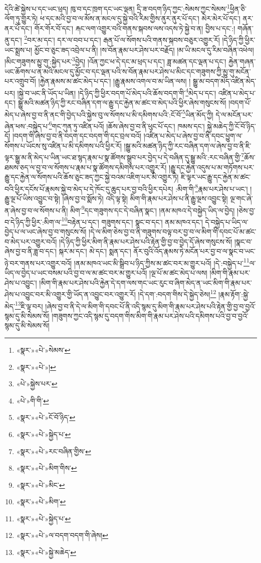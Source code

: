 དེའི་ཚེ་སྐྱེས་པ་དང་ཡང་ཕྲད། ཁུ་བ་དང་ཁྲག་དང་ཡང་ལྡན། དྲི་ཟ་བདག་ཉིད་ཀྱང་:སེམས་ཀྱང་སེམས་\footnote{«སྣར་»«པེ་»སེམས་}ཕྱིན་ཅི་ལོག་ཏུ་གྱུར་ཏེ། ཕ་དང་མའི་བྱ་བ་ལ་མོས་ན་མངལ་དུ་སྐྱེ་བའི་རིམ་གྱིས་ནུར་ནུར་པོ་དང་། མེར་མེར་པོ་དང་། ནར་ནར་པོ་དང་། གོར་གོར་བོ་དང་། རྐང་ལག་འགྱུར་བའི་གནས་སྐབས་ལས་འདས་ཏེ་སྐྱེ་བ་ན། བྱིས་པ་དང་:། གཞོན་ནུ་དང་། \footnote{«སྣར་»«པེ་»།  }བར་མ་དང་། དར་ལ་བབ་པ་དང་། རྒན་པོ་ལ་སོགས་པའི་གནས་སྐབས་བཅུར་འགྱུར་རོ། །དེ་ཉིད་ཀྱི་ཕྱིར་ཡང་སྨྲས་པ། མྱོང་བ་ཅུང་ཟད་འབྲེལ་པ་ནི། །ས་བོན་རྣམ་པར་ཤེས་པར་བརྗོད། །མ་ཡི་མངལ་དུ་རིམ་བཞིན་འཕེལ། །མིང་གཟུགས་མྱུ་གུ་:སྐྱེད་པར་\footnote{«པེ་»སྐྱེས་པར་}བྱེད། །འོན་ཀྱང་ཕ་དེ་དང་མ་ཕྲད་པ་དང་། ཟླ་མཚན་དང་ལྡན་པ་དང་། རྐྱེན་གཞན་ཡང་ཆོགས་པ་ན་མའི་མངལ་དུ་མྱོང་བ་དང་ལྡན་པའི་ས་བོན་རྣམ་པར་ཤེས་པ་མིང་དང་གཟུགས་ཀྱི་མྱུ་གུ་མངོན་པར་འགྲུབ་བོ། །རྐྱེན་རྣམས་མ་ཚང་མེད་པ་དང་། །རྒྱུ་རྣམས་འགལ་བ་མ་ཡིན་ལས། །
སྒྱུ་མ་བདག་མེད་འཛིན་མེད་པར། །སྐྱེ་བ་ཡང་ནི་ཡོད་པ་ཡིན། །དེ་ཉིད་ཀྱི་ཕྱིར་བདག་པོ་མེད་པའི་ཆོས་བདག་གི་\footnote{«པེ་»གི་གི་}མེད་པ་དང་། འཛིན་པ་མེད་པ་དང་། སྒྱུ་མའི་མཚན་ཉིད་ཀྱི་རང་བཞིན་དག་ལ་རྒྱུ་དང་རྐྱེན་མ་ཚང་བ་མེད་པའི་ཕྱིར་ཞེས་གསུངས་སོ། །བདག་པོ་མེད་པ་ཞེས་བྱ་བ་ནི་ནང་གི་བྱེད་པའི་སྐྱེས་བུ་ལ་སོགས་པ་མི་དམིགས་པའི་:ངོ་བོ་\footnote{«སྣར་»«པེ་»ངོ་བོ་ཉིད་}ཡིན་མོད་ཀྱི། དེ་ལ་མངོན་པར་ཞེན་ཕས་:བསྐྱེད་པ་\footnote{«སྣར་»«པེ་»སྐྱེད་པ་}གང་ཀུན་ཏུ་འཛིན་པའོ། །ཆོས་ཞེས་བྱ་བ་ནི་ཕུང་པོ་དང་། ཁམས་དང་། སྐྱེ་མཆེད་ཀྱི་ངོ་བོ་ཉིད་དོ། །བདག་གི་ཞེས་བྱ་བ་ནི་བདག་དང་བདག་གི་དང་བྲལ་བའོ། །འཛིན་པ་མེད་པ་ཞེས་བྱ་བ་ནི་དབང་ཕྱུག་ལ་སོགས་པ་ཡོངས་སུ་འཛིན་པ་མི་དམིགས་པའི་ཕྱིར་རོ། །སྒྱུ་མའི་མཚན་ཉིད་ཀྱི་རང་བཞིན་དག་ལ་ཞེས་བྱ་བ་ནི་ཇི་ལྟར་སྒྱུ་མ་ནི་མེད་པ་ཡིན་ཡང་ཐ་སྙད་རྣམ་པ་སྣ་ཚོགས་སྒྲུབ་པར་བྱེད་པ་དེ་བཞིན་དུ་སྒྱུ་མའི་:རང་བཞིན་གྱི་\footnote{«སྣར་»«པེ་»རང་བཞིན་གྱིས་}ཆོས་ཐམས་ཅད་ལ་བྱ་བ་ལ་སོགས་པ་རྣམ་པ་སྣ་ཚོགས་དམིགས་པར་འགྱུར་རོ། །རྒྱུ་དང་རྐྱེན་འདུས་པ་མ་གཏོགས་པར་རྒྱུ་དང་རྐྱེན་ལ་སོགས་པའི་ཆོས་ཅུང་ཟད་ཀྱང་སྐྱེ་བའམ་འཇིག་པར་མི་འགྱུར་ཏེ། ཇི་ལྟར་ཡང་རྒྱུ་དང་རྐྱེན་མ་ཚང་བའི་ཕྱིར་དངོས་པོ་རྣམས་སྐྱེ་བ་མེད་པ་དེ་ཁོང་དུ་ཆུད་པར་བྱ་བའི་ཕྱིར་དཔེར། :མིག་གི་\footnote{«སྣར་»«པེ་»མིག་གིས་}རྣམ་པར་ཤེས་པ་ཡང་། །རྒྱུ་ལྔ་པོ་ཡིས་འབྱུང་བ་སྟེ། །ཞེས་བྱ་བ་སྨོས་ཏེ། འདི་ལྟ་སྟེ། མིག་གི་རྣམ་པར་ཤེས་པ་ནི་རྒྱུ་ལྔས་འབྱུང་སྟེ། ལྔ་གང་ཞེ་ན་ཞེས་བྱ་བ་ལ་སོགས་པ་ནི། མིག་\footnote{«སྣར་»«པེ་»མིང་}དང་གཟུགས་དང་དེ་བཞིན་སྣང་། །ནམ་མཁའ་དེ་བསྐྱེད་ཡིད་ལ་བྱེད། །ཅེས་བྱ་བ་དེ་ཉིད་ཀྱི་ཕྱིར་:མིག་ལ་\footnote{«སྣར་»«པེ་»མིག་}བརྟེན་པ་དང་། གཟུགས་དང་། སྣང་བ་དང་། ནམ་མཁའ་དང་། དེ་བསྐྱེད་པ་ཡིད་ལ་བྱེད་པ་ལ་ཡང་ཞེས་བྱ་བ་གསུངས་སོ། །དེ་ལ་མིག་ཅེས་བྱ་བ་ནི་གཟུགས་བལྟ་བར་བྱ་བ་ལ་མིག་གི་དབང་པོ་མ་ཚང་བ་མེད་པར་འགྱུར་བའོ། །དེ་ཉིད་ཀྱི་ཕྱིར་མིག་ནི་རྣམ་པར་ཤེས་པའི་རྟེན་གྱི་བྱ་བ་བྱེད་དོ་ཞེས་གསུངས་སོ། །སྣང་བ་ཞེས་བྱ་བ་ནི་ཟླ་བ་དང་། སྐར་མ་དང་། མེ་དང་། སྨན་དང་། ནོར་བུའི་འོད་རྣམས་ཏེ་མངོན་པར་བྱ་བ་ལ་སྣང་བ་ཡང་ཉེ་བར་གནས་པར་འགྱུར་བའོ། །ནམ་མཁའ་ཡང་མི་སྒྲིབ་པ་ཉིད་ཀྱིས་མ་ཚང་བར་མ་གྱུར་པའོ། །དེ་:བསྐྱེད་པ་\footnote{«སྣར་»«པེ་»སྐྱེད་པ་}ལ་ཡིད་ལ་བྱེད་པ་ཡང་བསམ་པའི་བྱ་བ་ལ་མ་ཚང་བར་མ་གྱུར་པའོ། །ལྔ་པོ་མ་ཚང་མེད་པ་ལས། །མིག་གི་རྣམ་པར་ཤེས་པ་འབྱུང་། །མིག་གི་རྣམ་པར་ཤེས་པའི་རྐྱེན་དེ་དག་ལས་གང་ཡང་རུང་བ་ཞིག་མེད་ན་ཡང་མིག་གི་རྣམ་པར་ཤེས་པ་འབྱུང་བར་མི་འགྱུར་གྱི་ཡོད་ན་འབྱུང་བར་འགྱུར་རོ། །དེ་དག་:བདག་གིས་དེ་སྐྱེད་ཅེས།\footnote{«སྣར་»«པེ་»ལ་བདག་བདག་གི་ཞེས།} །རྣམ་རྟོག་:སྐྱེ་མེད་\footnote{«སྣར་»«པེ་»སྐྱེ་མཆེད་}ཇི་ལྟ་བར། །ཞེས་བྱ་བ་ནི་དེ་ལ་མིག་གི་དབང་པོ་ནི་འདི་སྙམ་དུ་མིག་གི་རྣམ་པར་ཤེས་པའི་རྟེན་གྱི་བྱ་བ་བྱའོ་སྙམ་དུ་མི་སེམས་སོ། །གཟུགས་ཀྱང་འདི་སྙམ་དུ་བདག་གིས་མིག་གི་རྣམ་པར་ཤེས་པའི་དམིགས་པའི་བྱ་བ་བྱའོ་སྙམ་དུ་མི་སེམས་སོ། 